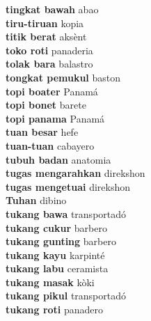 \textbf{ tingkat bawah  } abao \\
\textbf{ tiru-tiruan  } kopia \\
\textbf{ titik berat  } aksènt \\
\textbf{ toko roti  } panaderia \\
\textbf{ tolak bara  } balastro \\
\textbf{ tongkat pemukul  } baston \\
\textbf{ topi boater  } Panamá \\
\textbf{ topi bonet  } barete \\
\textbf{ topi panama  } Panamá \\
\textbf{ tuan besar  } hefe \\
\textbf{ tuan-tuan  } cabayero \\
\textbf{ tubuh badan  } anatomia \\
\textbf{ tugas mengarahkan  } direkshon \\
\textbf{ tugas mengetuai  } direkshon \\
\textbf{ Tuhan  } dibino \\
\textbf{ tukang bawa  } transportadó \\
\textbf{ tukang cukur  } barbero \\
\textbf{ tukang gunting  } barbero \\
\textbf{ tukang kayu  } karpinté \\
\textbf{ tukang labu  } ceramista \\
\textbf{ tukang masak  } kòki \\
\textbf{ tukang pikul  } transportadó \\
\textbf{ tukang roti  } panadero \\

